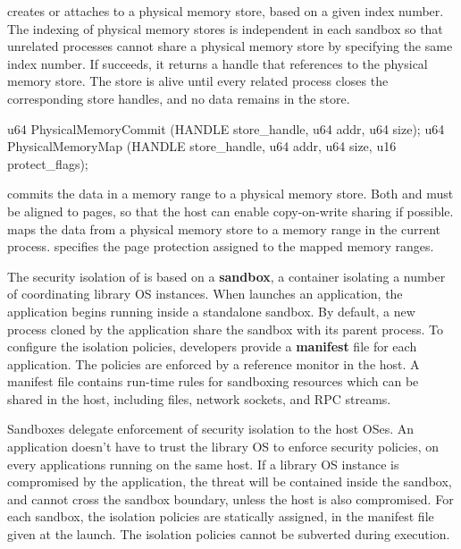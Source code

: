  creates or attaches to a physical memory store,
based on a given index number.
The indexing of physical memory stores is independent in each sandbox
so that unrelated processes cannot share a physical memory store by specifying the same index number.
If  succeeds,
it returns a handle that references to the physical memory store.
The store is alive until every related process closes the corresponding store handles,
and no data remains in the store.




\begin{paldef}
u64 PhysicalMemoryCommit (HANDLE store_handle, u64 addr, u64 size);
u64 PhysicalMemoryMap    (HANDLE store_handle, u64 addr, u64 size,
                          u16 protect_flags);
\end{paldef}


 commits the data in a memory range to a physical memory store.
Both  and  must be aligned to pages,
so that the host can enable copy-on-write sharing if possible.
 maps the data from a physical memory store
to a memory range in the current process.
 specifies the page protection assigned to the mapped memory ranges.




\label{sec:abi:proc:sandbox}


The security isolation of \graphene{} is based on a {\bf sandbox}, a container isolating a number of coordinating library OS instances.
When \graphene{} launches an application, the application begins running inside a standalone sandbox.
By default, a new process cloned by the application share the sandbox
with its parent process.
To configure the isolation policies,
developers provide a {\bf manifest} file for each application.
The policies are enforced by a reference monitor in the host.
A manifest file contains run-time rules for sandboxing resources which can be shared in the host,
including files, network sockets, and RPC streams.



Sandboxes delegate
enforcement of security isolation to the host OSes.
An application doesn't have to trust the library OS
to enforce security policies,
on every applications running on the same host.
If a library OS instance is compromised by the application,
the threat will be contained inside the sandbox,
and cannot cross the sandbox boundary, unless the host is also compromised.
For each sandbox,
the isolation policies are statically assigned,
in the manifest file given at the launch.
The isolation policies
cannot be subverted during execution.



